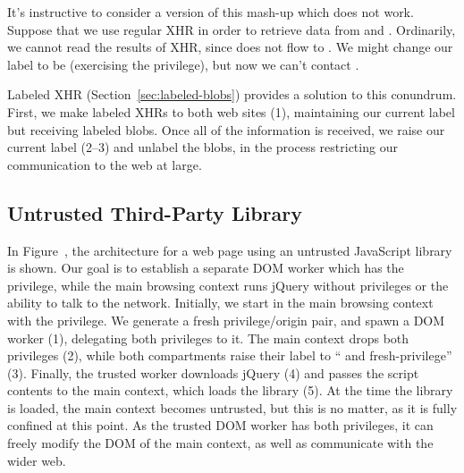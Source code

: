 It's instructive to consider a version of this mash-up which does not
work.  Suppose that we use regular XHR in order to retrieve data from
 and .  Ordinarily, we cannot read
the results of XHR, since  does not flow to .
We might change our label to be  (exercising the 
privilege), but now we can't contact .

Labeled XHR (Section~\ref{sec:labeled-blobs}) provides a solution to
this conundrum.  First, we make labeled XHRs to both web sites (1),
maintaining our current label but receiving labeled blobs.  Once all of
the information is received, we raise our current label (2--3) and
unlabel the blobs, in the process restricting our communication to the
web at large.

\subsection{Untrusted Third-Party Library}
\label{sec:apps-third-party}


In Figure~, the architecture for a web page using an
untrusted JavaScript library is shown.  Our goal is to establish a
separate DOM worker which has the  privilege, while the
main browsing context runs jQuery without privileges or the ability to
talk to the network.  Initially, we start in the main browsing context
with the  privilege.  We generate a fresh privilege/origin
pair, and spawn a DOM worker (1), delegating both privileges to it.  The
main context drops both privileges (2), while both compartments raise
their label to `` and fresh-privilege'' (3).  Finally, the
trusted worker downloads jQuery (4) and passes the script contents to
the main context, which loads the library (5).  At the time the library
is loaded, the main context becomes untrusted, but this is no matter, as
it is fully confined at this point.  As the trusted DOM worker has both
privileges, it can freely modify the DOM of the main context, as well as
communicate with the wider web.
